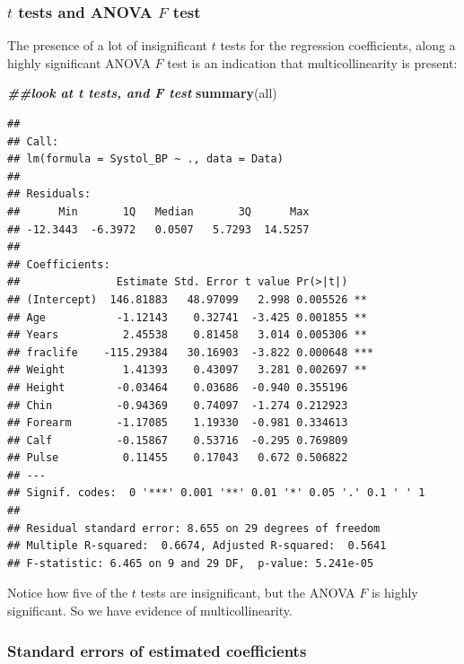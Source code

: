 \documentclass[
]{book}
\newenvironment{Shaded}{\begin{snugshade}}{\end{snugshade}}
\newcommand{\DocumentationTok}[1]{\textcolor[rgb]{0.56,0.35,0.01}{\textbf{\textit{#1}}}}
\newcommand{\FunctionTok}[1]{\textcolor[rgb]{0.13,0.29,0.53}{\textbf{#1}}}
\newcommand{\NormalTok}[1]{#1}
\begin{document}
\hypertarget{t-tests-and-anova-f-test}{%
\subsubsection*{\texorpdfstring{\(t\) tests and ANOVA \(F\) test}{t tests and ANOVA F test}}\label{t-tests-and-anova-f-test}}

The presence of a lot of insignificant \(t\) tests for the regression coefficients, along a highly significant ANOVA \(F\) test is an indication that multicollinearity is present:

\begin{Shaded}
\begin{Highlighting}[]
\DocumentationTok{\#\#look at t tests, and F test}
\FunctionTok{summary}\NormalTok{(all)}
\end{Highlighting}
\end{Shaded}

\begin{verbatim}
## 
## Call:
## lm(formula = Systol_BP ~ ., data = Data)
## 
## Residuals:
##      Min       1Q   Median       3Q      Max 
## -12.3443  -6.3972   0.0507   5.7293  14.5257 
## 
## Coefficients:
##               Estimate Std. Error t value Pr(>|t|)    
## (Intercept)  146.81883   48.97099   2.998 0.005526 ** 
## Age           -1.12143    0.32741  -3.425 0.001855 ** 
## Years          2.45538    0.81458   3.014 0.005306 ** 
## fraclife    -115.29384   30.16903  -3.822 0.000648 ***
## Weight         1.41393    0.43097   3.281 0.002697 ** 
## Height        -0.03464    0.03686  -0.940 0.355196    
## Chin          -0.94369    0.74097  -1.274 0.212923    
## Forearm       -1.17085    1.19330  -0.981 0.334613    
## Calf          -0.15867    0.53716  -0.295 0.769809    
## Pulse          0.11455    0.17043   0.672 0.506822    
## ---
## Signif. codes:  0 '***' 0.001 '**' 0.01 '*' 0.05 '.' 0.1 ' ' 1
## 
## Residual standard error: 8.655 on 29 degrees of freedom
## Multiple R-squared:  0.6674, Adjusted R-squared:  0.5641 
## F-statistic: 6.465 on 9 and 29 DF,  p-value: 5.241e-05
\end{verbatim}

Notice how five of the \(t\) tests are insignificant, but the ANOVA \(F\) is highly significant. So we have evidence of multicollinearity.

\hypertarget{standard-errors-of-estimated-coefficients}{%
\subsubsection*{Standard errors of estimated coefficients}\label{standard-errors-of-estimated-coefficients}}
\end{document}
